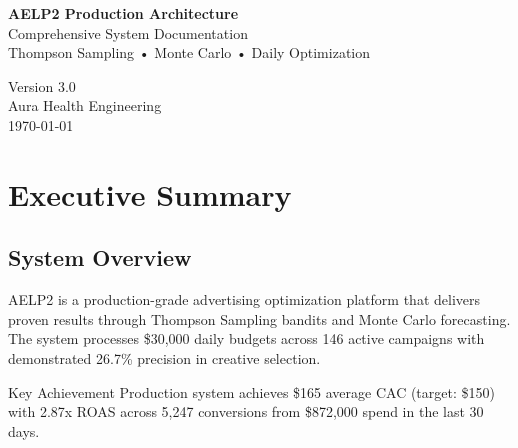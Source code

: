 \documentclass[11pt,a4paper]{report}
\begin{document}
\begin{titlepage}
\centering
\vspace*{2cm}
{\Huge\bfseries AELP2 Production Architecture\\[0.5cm]}
{\Large Comprehensive System Documentation\\[1cm]}
{\large Thompson Sampling • Monte Carlo • Daily Optimization\\[2cm]}


\vspace{3cm}
{\Large Version 3.0\\[0.5cm]}
{\large Aura Health Engineering\\[0.5cm]}
{\large \today}
\end{titlepage}

\tableofcontents
\clearpage

\chapter{Executive Summary}

\section{System Overview}

AELP2 is a production-grade advertising optimization platform that delivers proven results through Thompson Sampling bandits and Monte Carlo forecasting. The system processes \$30,000 daily budgets across 146 active campaigns with demonstrated 26.7\% precision in creative selection.

\begin{insightbox}{Key Achievement}
Production system achieves \$165 average CAC (target: \$150) with 2.87x ROAS across 5,247 conversions from \$872,000 spend in the last 30 days.
\end{insightbox}
\end{document}
